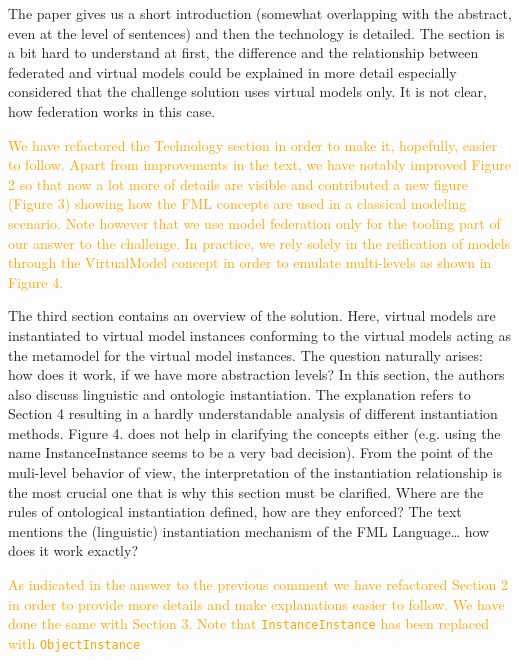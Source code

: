 \documentclass[10pt]{article}
\begin{document}
\begin{response}{The paper gives us a short introduction (somewhat overlapping with the abstract, even at the level of sentences) and then the technology is detailed. The section is a bit hard to understand at first, the difference and the relationship between federated and virtual models could be explained in more detail especially considered that the challenge solution uses virtual models only. It is not clear, how federation works in this case.} 

\textcolor{orange}{We have refactored the Technology section in order to make it, hopefully, easier to follow. Apart from improvements in the text, we have notably improved Figure 2 so that now a lot more of details are visible and contributed a new figure (Figure 3) showing how the FML concepts are used in a classical modeling scenario. Note however that we use model federation only for the tooling part of our answer to the challenge. In practice, we rely solely in the reification of models through the VirtualModel concept in order to emulate multi-levels as shown in Figure 4.}

\end{response}

\begin{response}{The third section contains an overview of the solution. Here, virtual models are instantiated to virtual model instances conforming to the virtual models acting as the metamodel for the virtual model instances. The question naturally arises: how does it work, if we have more abstraction levels?  In this section, the authors also discuss linguistic and ontologic instantiation. The explanation refers to Section 4 resulting in a hardly understandable analysis of different instantiation methods. Figure 4. does not help in clarifying the concepts either (e.g. using the name InstanceInstance seems to be a very bad decision). From the point of the muli-level behavior of view, the interpretation of the instantiation relationship is the most crucial one that is why this section must be clarified. Where are the rules of ontological instantiation defined, how are they enforced? The text mentions the (linguistic) instantiation mechanism of the FML Language… how does it work exactly?} 

\textcolor{orange}{As indicated in the answer to the previous comment we have refactored Section 2 in order to provide more details and make explanations easier to follow. We have done the same with Section 3. Note that \texttt{InstanceInstance} has been replaced with \texttt{ObjectInstance}} 

\end{response}
\end{document}
